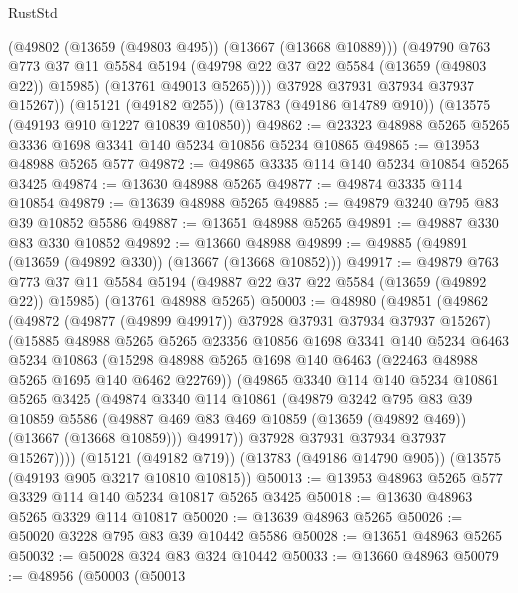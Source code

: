 \begin{lexlean}{RustStd}
\begin{coremodule}
            (@49802 (@13659 (@49803 @495)) (@13667 (@13668 @10889)))
            (@49790
              @763
              @773
              @37
              @11
              @5584
              @5194
              (@49798 @22 @37 @22 @5584 (@13659 (@49803 @22)) @15985)
              (@13761 @49013 @5265))))
        @37928
        @37931
        @37934
        @37937
        @15267))
    (@15121 (@49182 @255))
    (@13783 (@49186 @14789 @910))
    (@13575 (@49193 @910 @1227 @10839 @10850))
@49862 := @23323 @48988 @5265 @5265 @3336 @1698 @3341 @140 @5234 @10856 @5234 @10865
@49865 := @13953 @48988 @5265 @577
@49872 := @49865 @3335 @114 @140 @5234 @10854 @5265 @3425
@49874 := @13630 @48988 @5265
@49877 := @49874 @3335 @114 @10854
@49879 := @13639 @48988 @5265
@49885 := @49879 @3240 @795 @83 @39 @10852 @5586
@49887 := @13651 @48988 @5265
@49891 := @49887 @330 @83 @330 @10852
@49892 := @13660 @48988
@49899 := @49885 (@49891 (@13659 (@49892 @330)) (@13667 (@13668 @10852)))
@49917 := @49879
    @763
    @773
    @37
    @11
    @5584
    @5194
    (@49887 @22 @37 @22 @5584 (@13659 (@49892 @22)) @15985)
    (@13761 @48988 @5265)
@50003 := @48980
    (@49851
      (@49862
        (@49872 (@49877 (@49899 @49917)) @37928 @37931 @37934 @37937 @15267)
        (@15885
          @48988
          @5265
          @5265
          @23356
          @10856
          @1698
          @3341
          @140
          @5234
          @6463
          @5234
          @10863
          (@15298 @48988 @5265 @1698 @140 @6463 (@22463 @48988 @5265 @1695 @140 @6462 @22769))
          (@49865
            @3340
            @114
            @140
            @5234
            @10861
            @5265
            @3425
            (@49874
              @3340
              @114
              @10861
              (@49879
                @3242
                @795
                @83
                @39
                @10859
                @5586
                (@49887 @469 @83 @469 @10859 (@13659 (@49892 @469)) (@13667 (@13668 @10859)))
                @49917))
            @37928
            @37931
            @37934
            @37937
            @15267))))
    (@15121 (@49182 @719))
    (@13783 (@49186 @14790 @905))
    (@13575 (@49193 @905 @3217 @10810 @10815))
@50013 := @13953 @48963 @5265 @577 @3329 @114 @140 @5234 @10817 @5265 @3425
@50018 := @13630 @48963 @5265 @3329 @114 @10817
@50020 := @13639 @48963 @5265
@50026 := @50020 @3228 @795 @83 @39 @10442 @5586
@50028 := @13651 @48963 @5265
@50032 := @50028 @324 @83 @324 @10442
@50033 := @13660 @48963
@50079 := @48956
    (@50003
      (@50013

\end{coremodule}
\end{lexlean}
